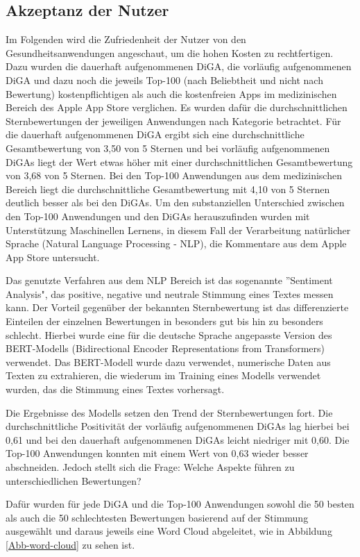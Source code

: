 \documentclass{article}
\begin{document}
		\subsection{Akzeptanz der Nutzer}
			Im Folgenden wird die Zufriedenheit der Nutzer von den Gesundheitsanwendungen angeschaut, um die hohen Kosten zu rechtfertigen. Dazu wurden die dauerhaft aufgenommenen DiGA, die vorläufig aufgenommenen DiGA und dazu noch die jeweils Top-100 (nach Beliebtheit und nicht nach Bewertung) kostenpflichtigen als auch die kostenfreien Apps im medizinischen Bereich des Apple App Store verglichen. Es wurden dafür die durchschnittlichen Sternbewertungen der jeweiligen Anwendungen nach Kategorie betrachtet. Für die dauerhaft aufgenommenen DiGA ergibt sich eine durchschnittliche Gesamtbewertung von 3,50 von 5 Sternen und bei vorläufig aufgenommenen DiGAs liegt der Wert etwas höher mit einer durchschnittlichen Gesamtbewertung von 3,68 von 5 Sternen. Bei den Top-100 Anwendungen aus dem medizinischen Bereich liegt die durchschnittliche Gesamtbewertung mit 4,10 von 5 Sternen deutlich besser als bei den DiGAs. Um den substanziellen Unterschied zwischen den Top-100 Anwendungen und den DiGAs herauszufinden wurden mit Unterstützung Maschinellen Lernens, in diesem Fall der Verarbeitung natürlicher Sprache (Natural Language Processing - NLP), die Kommentare aus dem Apple App Store untersucht.\par
			Das genutzte Verfahren aus dem NLP Bereich ist das sogenannte ''Sentiment Analysis", das positive, negative und neutrale Stimmung eines Textes messen kann. Der Vorteil gegenüber der bekannten Sternbewertung ist das differenzierte Einteilen der einzelnen Bewertungen in besonders gut bis hin zu besonders schlecht. Hierbei wurde eine für die deutsche Sprache angepasste Version des BERT-Modells (Bidirectional Encoder Representations from Transformers) verwendet. Das BERT-Modell wurde dazu verwendet, numerische Daten aus Texten zu extrahieren, die wiederum im Training eines Modells verwendet wurden, das die Stimmung eines Textes vorhersagt.\par
			Die Ergebnisse des Modells setzen den Trend der Sternbewertungen fort. Die durchschnittliche Positivität der vorläufig aufgenommenen DiGAs lag hierbei bei 0,61 und bei den dauerhaft aufgenommenen DiGAs leicht niedriger mit 0,60. Die Top-100 Anwendungen konnten mit einem Wert von 0,63 wieder besser abschneiden. Jedoch stellt sich die Frage: Welche Aspekte führen zu unterschiedlichen Bewertungen?\par
			Dafür wurden für jede DiGA und die Top-100 Anwendungen sowohl die 50 besten als auch die 50 schlechtesten Bewertungen basierend auf der Stimmung ausgewählt und daraus jeweils eine Word Cloud abgeleitet, wie in Abbildung \ref{Abb-word-cloud} zu sehen ist.
\end{document}

